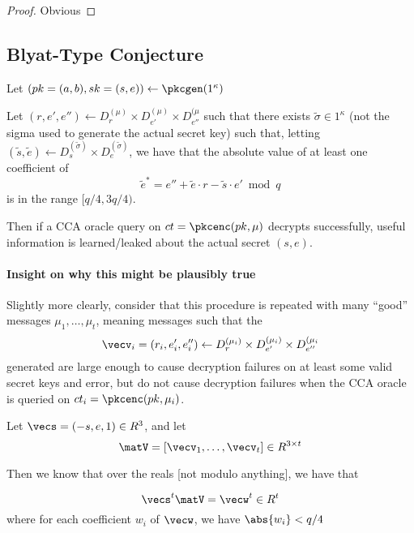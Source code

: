 \begin{proof}Obvious
\end{proof}

\subsection{Blyat-Type Conjecture}
\label{sec:blyat-type-conj}

\begin{conjecture}
Let $(pk=(a,b),sk=(s,e)) \gets \pkcgen(1^{\kappa})$ 


Let $(r,e',e'') \gets D^{(\mu)}_{r} \times D^{(\mu)}_{e'} \times
D^{(\mu}_{e''}$ such that there exists $\tilde{\sigma} \in 1^{\kappa}$ (not
the sigma used to generate the actual secret key) such
that, letting
$(\tilde{s},\tilde{e}) \gets D^{(\tilde{\sigma})}_{s} \times
D^{(\tilde{\sigma})}_{e}$, we have that the absolute value of at least one coefficient of 
\[\tilde{e}^*=e''+\tilde{e}\cdot r - \tilde{s}\cdot e' \bmod{q}\] is
in the range $[q/4,3q/4)$. 

Then if a CCA oracle query on $ct=\pkcenc(pk,\mu)$ decrypts
successfully, useful information is learned/leaked about the actual
secret $(s,e)$. 
\end{conjecture}


\paragraph{Insight on why this might be plausibly true}

Slightly more clearly, consider that this procedure is repeated with many ``good''
messages $\mu_{1}, \ldots, \mu_{t}$, meaning messages such that the 
\[\vecv_{i}=(r_{i},e'_{i},e''_{i}) \gets D^{(\mu_{i})}_{r} \times
  D^{(\mu_{i})}_{e'} \times D^{(\mu_{i}}_{e''} \]
 generated are large enough to cause
decryption failures on at least some valid secret keys and error, but
do not cause decryption failures when the CCA oracle is queried on
$ct_{i}=\pkcenc(pk,\mu_{i})$. 

Let $\vecs=(-s,e,1) \in R^{3}$, and let 
\[\matV=[\vecv_{1},\ldots, \vecv_{t}] \in R^{3 \times t}\]

Then we know that over the reals [not modulo anything], we have that 

\[\vecs^{t}\matV=\vecw^{t} \in R^{t} \]
where for each coefficient $w_i$ of $\vecw$, we have $\abs{w_i}<q/4$

